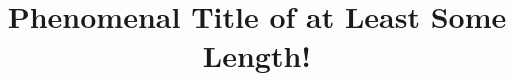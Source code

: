 \documentclass[english]{fhnwfactsheet}
\title{Phenomenal Title of at Least Some Length!}
\begin{document}
    \makefactsheet
\end{document}
